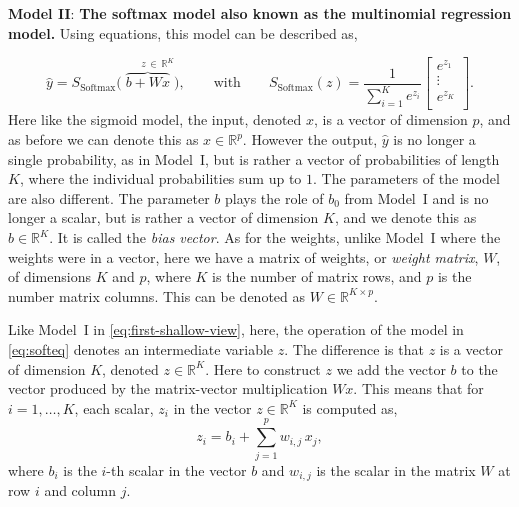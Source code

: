 \noindent
{\bf Model II}: {\bf The softmax model also known as the multinomial regression model.} Using equations, this model can be described as,

%
\begin{equation}
\label{eq:softeq}
\hat{y}=S_{\text{Softmax}} \big(\overbrace{b+W  x}^{\quad \,\,\, \, \,\, z\, \in \, {\mathbb R}^K}\big),
%
\qquad
\text{with}
\qquad
%
S_{\textrm{Softmax}}(z) = \frac{1}{\sum_{i=1}^{K} e^{z_i}} 
\begin{bmatrix}
e^{z_1} \\
\vdots\\
e^{z_{K}}\\
\end{bmatrix}.
\end{equation}
%
Here like the sigmoid model, the input, denoted $x$, is a vector of dimension $p$, and as before we can denote this as  $x\in {\mathbb R}^p$. However the output, $\hat{y}$ is no longer a single probability, as in Model~I, but is rather a vector of probabilities of length $K$, where the individual probabilities sum up to $1$. The parameters of the model are also different. The parameter $b$ plays the role of $b_0$ from Model~I and is no longer a scalar, but is rather a vector of dimension $K$, and we denote this as $b\in {\mathbb R}^K$. It is called the {\em bias vector}. As for the weights, unlike Model~I where the weights were in a vector, here we have a matrix of weights, or {\em weight matrix}, $W$, of dimensions $K$ and $p$, where $K$ is the number of matrix rows, and $p$ is the number matrix columns. This can be denoted as $W\in {\mathbb R}^{K\times p}$.

Like Model~I in \eqref{eq:first-shallow-view}, here, the operation of the model in \eqref{eq:softeq} denotes an intermediate variable $z$. The difference is that $z$ is a vector of dimension $K$, denoted $z \in {\mathbb R}^K$. Here to construct $z$ we add the vector $b$ to the vector produced by the matrix-vector multiplication $W x$. 
This means that for $i=1,\dots,K$, each scalar, $z_i$ in the vector $z\in {\mathbb R}^K$ is computed as,
%
\begin{equation}
\label{eq:small-zk-log-mult}
z_i = b_i + \sum_{j=1}^p w_{i,j} \, x_j,
\end{equation}
%
where $b_i$ is the $i$-th scalar in the vector $b$ and $w_{i,j}$ is the scalar in the matrix $W$ at row $i$ and column $j$.

